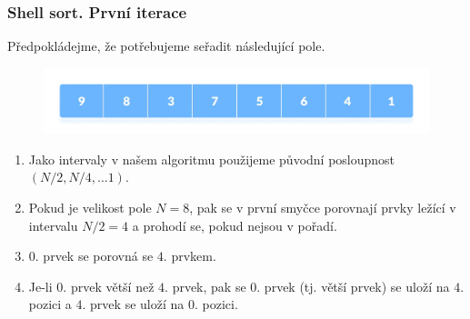 \documentclass[12pt]{beamer}
\begin{document}

\begin{frame}
    \frametitle{Shell sort. První iterace}
    \fontsize{10pt}{12pt}\selectfont
    \begin{block}{Předpokládejme, že potřebujeme seřadit následující pole.}
        
        \begin{figure}[htb]
        \centering
        \includegraphics[scale=0.175]{1.jpg}
        
        \end{figure}
    \end{block}
    \begin{enumerate}
        \item Jako intervaly v našem algoritmu použijeme původní posloupnost $(N/2, N/4, ...1)$.
        
        \item Pokud je velikost pole $N = 8$, pak se v první smyčce porovnají prvky ležící v intervalu $N/2 = 4$ a prohodí se, pokud nejsou v pořadí.
        \item $0.$ prvek se porovná se $4.$ prvkem.
        \item Je-li $0.$ prvek větší než $4.$ prvek, pak se $0.$ prvek (tj. větší prvek) se uloží na $4.$ pozici a $4.$ prvek se uloží na $0.$ pozici.
    \end{enumerate}
\end{frame}
\end{document}
